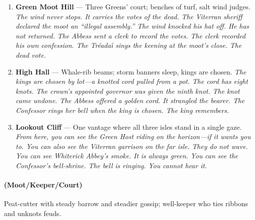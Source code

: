 \begin{enumerate}
\item[Q] \textbf{Green Moot Hill} --- Three Greens' court; benches of turf, salt wind judges.
  \hfill \textit{The wind never stops. It carries the votes of the dead. The Viterran sheriff declared the moot an ``illegal assembly.'' The wind knocked his hat off. He has not returned. The Abbess sent a clerk to record the votes. The clerk recorded his own confession. The Tr\'eada\'{\i} sings the keening at the moot's close. The dead vote.}
\item[K] \textbf{High Hall} --- Whale-rib beams; storm banners sleep, kings are chosen.
  \hfill \textit{The kings are chosen by lot---a knotted cord pulled from a pot. The cord has eight knots. The crown's appointed governor was given the ninth knot. The knot came undone. The Abbess offered a golden cord. It strangled the bearer. The Confessor rings her bell when the king is chosen. The king remembers.}
\item[A] \textbf{Lookout Cliff} --- One vantage where all three isles stand in a single gaze.
  \hfill \textit{From here, you can see the Green Host riding on the horizon---if it wants you to. You can also see the Viterran garrison on the far isle. They do not wave. You can see Whiterick Abbey's smoke. It is always green. You can see the Confessor's bell-shrine. The bell is ringing. You cannot hear it.}
\end{enumerate}

\paragraph*{(Moot/Keeper/Court)} Peat-cutter with steady barrow and steadier gossip; well-keeper who ties ribbons and unknots feuds.

